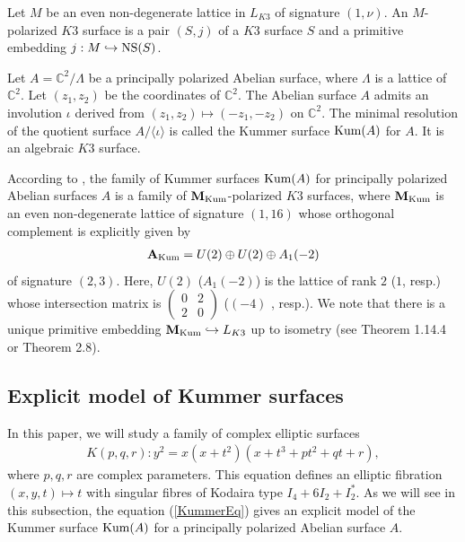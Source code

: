 \documentclass[10pt]{article}
\begin{document}
Let $M$ be an even non-degenerate lattice in $L_{K3}$ of signature $(1,\nu)$.
An $M$-polarized $K3$ surface is a pair $(S,j)$ of a $K3$ surface $S$ and a primitive embedding $j: M\hookrightarrow {\rm NS} (S)$.


Let $A=\mathbb{C}^2/\Lambda$ be a principally polarized Abelian surface,
where $\Lambda$ is a lattice of $\mathbb{C}^2$.
Let $(z_1,z_2)$ be the coordinates of $\mathbb{C}^2$.
The Abelian surface $A$ admits an involution $\iota$ derived from $(z_1,z_2) \mapsto (-z_1,-z_2)$ on $\mathbb{C}^2$.
The minimal resolution of the quotient surface $A/\langle \iota \rangle$ is called the Kummer surface ${\rm Kum}(A)$ for $A$. 
It is an algebraic $K3$ surface.

According to \cite{Mo}, the family of Kummer surfaces ${\rm Kum}(A)$ for principally polarized Abelian surfaces $A$ is a family of ${\bf M_{\rm Kum}}$-polarized $K3$ surfaces,
where ${\bf M_{\rm Kum}}$ is an even non-degenerate lattice of signature $(1,16)$
whose orthogonal complement  is explicitly given by
\begin{align}\label{TrKum}
{\bf A_{\rm Kum}} =U(2) \oplus U(2) \oplus A_1(-2)
\end{align}
of signature $(2,3)$.
Here, $U(2)$ ($A_1(-2)$) is the lattice of rank $2$ ($1$, resp.) whose intersection matrix is $\begin{pmatrix} 0 & 2 \\ 2 & 0 \end{pmatrix}$ ($(-4)$ , resp.).
We note that there is a unique primitive embedding $ {\bf M_{\rm Kum}} \hookrightarrow L_{K3}$ up to isometry
(see \cite{NiBilinear} Theorem 1.14.4 or \cite{Mo} Theorem 2.8).



\subsection{Explicit model of Kummer surfaces}

In this paper, we will study a family of complex elliptic surfaces
\begin{align}\label{KummerEq}
K(p,q,r): y^2 =x(x+t^2) (x+t^3 +p t^2 + q t +r),
\end{align}
where $p,q,r$ are complex parameters.
This equation defines an elliptic fibration $(x,y,t) \mapsto t$ with singular fibres of Kodaira type $I_4+6 I_2 + I_2^*$.
As we will see in this subsection, 
the equation (\ref{KummerEq}) gives an explicit model of the Kummer surface ${\rm Kum}(A)$ for a principally polarized Abelian surface $A$.
\end{document}
